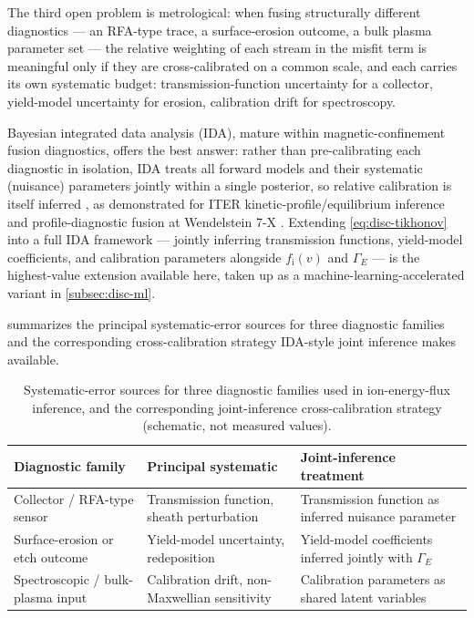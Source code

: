 The third open problem is metrological: when fusing structurally different diagnostics — an RFA-type trace, a surface-erosion outcome, a bulk plasma parameter set — the relative weighting of each stream in the misfit term is meaningful only if they are cross-calibrated on a common scale, and each carries its own systematic budget: transmission-function uncertainty for a collector, yield-model uncertainty for erosion, calibration drift for spectroscopy.

Bayesian integrated data analysis (IDA), mature within magnetic-confinement fusion diagnostics, offers the best answer: rather than pre-calibrating each diagnostic in isolation, IDA treats all forward models and their systematic (nuisance) parameters jointly within a single posterior, so relative calibration is itself inferred \cite{ref0706}, as demonstrated for ITER kinetic-profile/equilibrium inference \cite{ref0706} and profile-diagnostic fusion at Wendelstein 7-X \cite{ref0713}. Extending \cref{eq:disc-tikhonov} into a full IDA framework — jointly inferring transmission functions, yield-model coefficients, and calibration parameters alongside $f_{\mathrm{i}}(v)$ and $\Gamma_{E}$ — is the highest-value extension available here, taken up as a machine-learning-accelerated variant in \cref{subsec:disc-ml}.

 summarizes the principal systematic-error sources for three diagnostic families and the corresponding cross-calibration strategy IDA-style joint inference makes available.

\begin{table}[htbp]
\centering
\caption{Systematic-error sources for three diagnostic families used in ion-energy-flux inference, and the corresponding joint-inference cross-calibration strategy (schematic, not measured values).}
\label{tab:disc-crosscal}
\begin{tabularx}{\linewidth}{@{}l X X@{}}
\toprule
Diagnostic family & Principal systematic & Joint-inference treatment \\
\midrule
Collector / RFA-type sensor & Transmission function, sheath perturbation & Transmission function as inferred nuisance parameter \\
Surface-erosion or etch outcome & Yield-model uncertainty, redeposition & Yield-model coefficients inferred jointly with $\Gamma_{E}$ \\
Spectroscopic / bulk-plasma input & Calibration drift, non-Maxwellian sensitivity & Calibration parameters as shared latent variables \\
\bottomrule
\end{tabularx}
\end{table}

